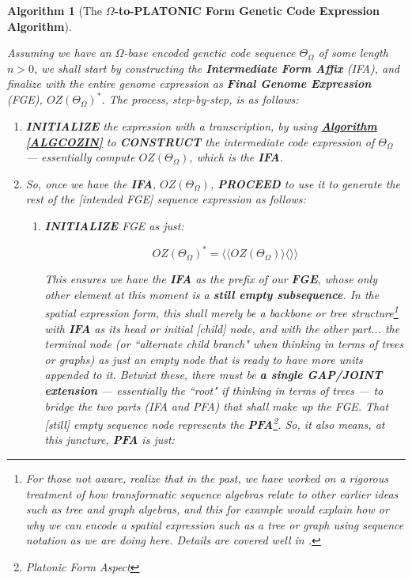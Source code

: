 \documentclass[a4paper, 18pt]{book} %
\newtheorem{alg}{Algorithm}
\begin{document}
\vspace{2em}
\begin{alg}[The \textbf{$\Omega$-to-PLATONIC Form Genetic Code Expression Algorithm}]
\label{ALGCOZINPLATO}

Assuming we have an $\Omega$-base encoded genetic code sequence $\Theta_\Omega$ of some length $n > 0$, we shall start by constructing the \textbf{Intermediate Form Affix} (IFA), and finalize with the entire genome expression as \textbf{Final Genome Expression} (FGE), $\boxed{OZ(\Theta_\Omega)}^*$. The process, step-by-step, is as follows:\\

\begin{enumerate}
    \item{\textbf{INITIALIZE} the expression with a transcription, by using \textbf{\hyperref[ALGCOZIN]{Algorithm \ref{ALGCOZIN}}} to \textbf{CONSTRUCT} the intermediate code expression of $\Theta_\Omega$ --- essentially compute $OZ(\Theta_\Omega)$, which is the \textbf{IFA}.
    }
\item{ So, once we have the \textbf{IFA}, $OZ(\Theta_\Omega)$, \textbf{PROCEED} to use it to generate the rest of the [intended FGE] sequence expression as follows: 
\begin{enumerate}
\item {\textbf{INITIALIZE} FGE  as just:

\vspace{1em}
\begin{equation}
\label{EQSTARTFGE}
\boxed{OZ(\Theta_\Omega)}^* = \langle \langle OZ(\Theta_\Omega) \rangle \langle \rangle \rangle
\end{equation}
\vspace{1em}

This ensures we have the \textbf{IFA} as the prefix of our \textbf{FGE}, whose only other element at this moment is a \textbf{still empty subsequence}. In the spatial expression form, this shall merely be a backbone or tree structure\footnote{For those not aware, realize that in the past, we have worked on a rigorous treatment of how transformatic sequence algebras relate to other earlier ideas such as tree and graph algebras, and this for example would explain how or why we can encode a spatial expression such as a tree or graph using sequence notation as we are doing here. Details are covered well in \cite{treealgebras_review}.} with \textbf{IFA} as its head or initial [child] node, and with the other part... the terminal node (or ``alternate child branch" when thinking in terms of trees or graphs) as just an empty node that is ready to have more units appended to it. Betwixt these, there must be \textbf{a single GAP/JOINT extension} --- essentially the ``root" if thinking in terms of trees --- to bridge the two parts (IFA and PFA) that shall make up the FGE. That [still] empty sequence node represents the \textbf{PFA}\footnote{Platonic Form Aspect}. So, it also means, at this juncture, \textbf{PFA} is just:

}
\end{enumerate}}
\end{enumerate}
\end{alg}
\end{document}
